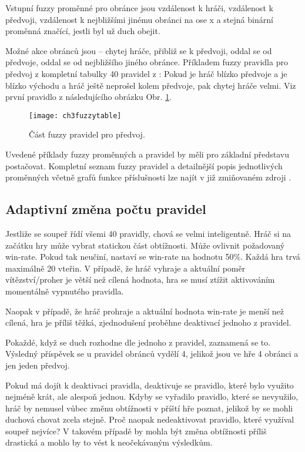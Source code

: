 Vstupní fuzzy proměnné pro obránce jsou vzdálenost k hráči, vzdálenost k předvoji, vzdálenost k nejbližšími jinému obránci na ose x a stejná binární proměnná značící, jestli byl už duch obejit.

Možné akce obránců jsou – chytej hráče, přibliž se k předvoji, oddal se od předvoje, oddal se od nejbližšího jiného obránce.
Příkladem fuzzy pravidla pro předvoj z kompletní tabulky 40 pravidel z \cite{25deadend} :
Pokud je hráč blízko předvoje a je blízko východu a hráč ještě neprošel kolem předvoje, pak chytej hráče velmi. Viz první pravidlo z následujícího obrázku Obr. \ref{fig-ch3fuzzytable}.

\begin{figure}
  \centering
  \texttt{[image: ch3fuzzytable]}
	\caption{Část fuzzy pravidel pro předvoj. \cite{25deadend} }
	\label{fig-ch3fuzzytable}
\end{figure}

Uvedené příklady fuzzy proměnných a pravidel by měli pro základní představu postačovat. Kompletní seznam fuzzy pravidel a detailnější popis jednotlivých proměnných včetně grafů funkce příslušnosti lze najít v již zmiňovaném zdroji \cite{25deadend}.

\subsection{Adaptivní změna počtu pravidel}

Jestliže se soupeř řídí všemi 40 pravidly, chová se velmi inteligentně. Hráč si na začátku hry může vybrat statickou část obtížnosti. Může ovlivnit požadovaný win-rate. Pokud tak neučiní, nastaví se win-rate na hodnotu 50\%. Každá hra trvá maximálně 20 vteřin. V případě, že hráč vyhraje a aktuální poměr vítězství/proher  je větší než cílená hodnota, hra se musí ztížit aktivováním momentálně vypnutého pravidla.

Naopak v případě, že hráč prohraje a aktuální hodnota win-rate je menší než cílená, hra je příliš těžká, zjednodušení proběhne deaktivací jednoho z pravidel.

Pokaždé, když se duch rozhodne dle jednoho z pravidel, zaznamená se to. Výsledný příspěvek se u pravidel obránců vydělí 4, jelikož jsou ve hře 4 obránci a jen jeden předvoj.

Pokud má dojít k deaktivaci pravidla, deaktivuje se pravidlo, které bylo využito nejméně krát, ale alespoň jednou. Kdyby se vyřadilo pravidlo, které se nevyužilo, hráč by nemusel vůbec změnu obtížnosti v příští hře poznat, jelikož by se mohli duchová chovat zcela stejně. Proč naopak nedeaktivovat pravidlo, které využíval soupeř nejvíce? V takovém případě by mohla být změna obtížnosti příliš drastická a mohlo by to vést k neočekávaným výsledkům.

